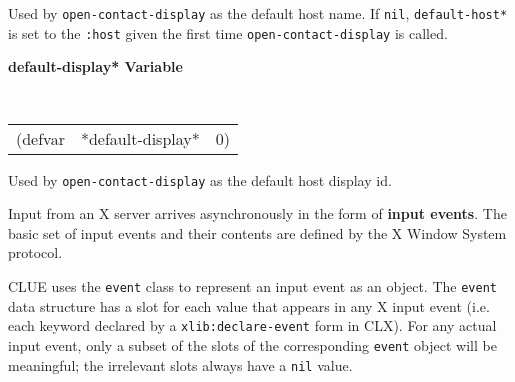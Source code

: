 \documentclass[twoside]{book}
\begin{document}
\begin{sloppy}
\begin{flushright} \parbox[t]{6.125in}{
Used by {\tt open-contact-display} as the default host name.
If {\tt nil}, {\tt *default-host*} is set
to the {\tt :host} given the first time {\tt open-contact-display} is called.

}\end{flushright}


{\samepage
{\large {\bf *default-display* \hfill Variable}} 
\begin{flushright} \parbox[t]{6.125in}{
\tt
\begin{tabular}{lll}
\raggedright
(defvar & *default-display* & 0)
\end{tabular}
\rm

}\end{flushright}}

\begin{flushright} \parbox[t]{6.125in}{
Used by {\tt open-contact-display} as the default host display id.
}\end{flushright}


Input from an X server arrives
asynchronously in the form of {\bf input events}. 
The basic set of input events and their contents are defined by the X Window
System protocol.

CLUE uses the {\tt event} class to represent an input event as an
object. The {\tt event} data structure has a slot for each value that appears in
any X input event (i.e. each
keyword declared by a {\tt xlib:declare-event} form in CLX). 
For any actual input event, only a subset of the slots of the
corresponding {\tt event} object will be meaningful; the irrelevant slots
always have a {\tt nil} value.


\end{sloppy}
\end{document}
